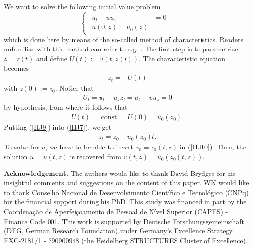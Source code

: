 \documentclass[12pt,twoside]{amsart}
\numberwithin{equation}{section}
\begin{document}
\begin{appendices}
We want to solve the following initial value problem
\begin{equation}
\begin{cases}
\begin{aligned}
 \displaystyle u_{t} -u u_{z} &= 0  \\
  \displaystyle u(0,z) = u_{0}(z)
  \end{aligned}
  \end{cases}
 ,\label{HJ6}
\end{equation}
which is done here by means of the so-called method of characteristics. Readers unfamiliar with this method can refer to e.g. \cite{evans1998partial}. The first step is to parametrize $z = z(t)$ and define $U(t) := u(t,z(t))$. The characteristic equation becomes
\begin{eqnarray}
z_{t} = -U(t) \label{HJ7}
\end{eqnarray}
with $z(0) := z_{0}$. Notice that
\begin{eqnarray}
U_{t} = u_{t}+u_{z}z_{t} = u_{t} -u u_{z} = 0 \label{HJ8} 
\end{eqnarray}
by hypothesis, from where it follows that
\begin{eqnarray}
U(t) = \operatorname{const} = U(0) = u_{0}(z_{0}). \label{HJ9}
\end{eqnarray}
Putting (\ref{HJ9}) into (\ref{HJ7}), we get
\begin{eqnarray}
z_{t} = z_{0}-u_{0}(z_{0})t. \label{HJ10}
\end{eqnarray}
To solve for $u$, we have to be able to invert $z_{0} = z_{0}(t,z)$ in (\ref{HJ10}). Then, the solution $u = u(t,z)$ is recovered from $u(t,z) = u_{0}(z_{0}(t,z))$. 





\end{appendices}


\noindent
{\bf Acknowledgement. } The authors would like to thank David Brydges for his insightful comments and suggestions on the content of this paper. WK would like to thank Conselho Nacional de Desenvolvimento Cient\'ifico e Tecnol\' ogico (CNPq) for the financial support during his PhD. This study was financed in part by the Coordena\c c\~ ao de Aperfei\c coamento de Pessoal de N\' ivel Superior (CAPES) - Finance Code 001. This work is supported by Deutsche Forschungsgemeinschaft (DFG, German Research Foundation) under Germany's Excellence Strategy  EXC-2181/1 - 390900948 (the Heidelberg STRUCTURES Cluster of Excellence). 
\end{document}
